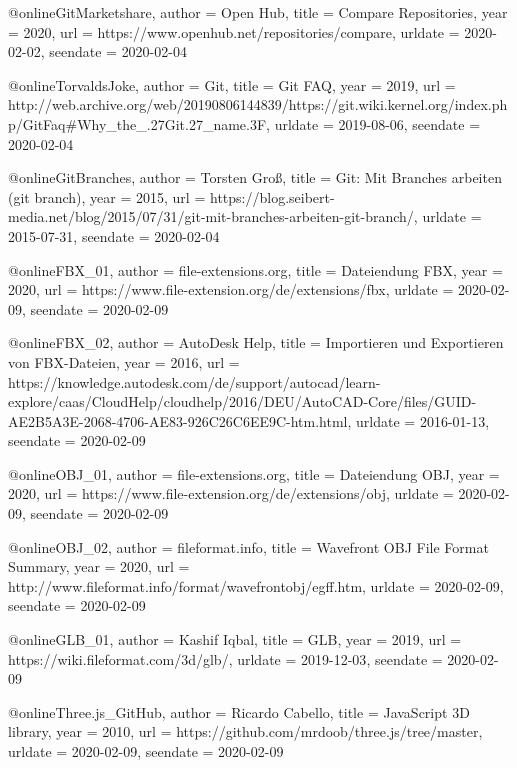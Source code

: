 {{{@online{GitMarketshare,
  author   = {Open Hub},
  title    = {Compare Repositories},
  year     = 2020,
  url      = {https://www.openhub.net/repositories/compare},
  urldate  = {2020-02-02},
  seendate = {2020-02-04}
}

@online{TorvaldsJoke,
  author   = {Git},
  title    = {Git FAQ},
  year     = 2019,
  url      = {http://web.archive.org/web/20190806144839/https://git.wiki.kernel.org/index.php/GitFaq#Why_the_.27Git.27_name.3F},
  urldate  = {2019-08-06},
  seendate = {2020-02-04}
}

@online{GitBranches,
  author   = {Torsten Groß},
  title    = {Git: Mit Branches arbeiten (git branch)},
  year     = 2015,
  url      = {https://blog.seibert-media.net/blog/2015/07/31/git-mit-branches-arbeiten-git-branch/},
  urldate  = {2015-07-31},
  seendate = {2020-02-04}
}

@online{FBX_01,
  author   = {file-extensions.org},
  title    = {Dateiendung FBX},
  year     = 2020,
  url      = {https://www.file-extension.org/de/extensions/fbx},
  urldate  = {2020-02-09},
  seendate = {2020-02-09}
}

@online{FBX_02,
  author   = {AutoDesk Help},
  title    = {Importieren und Exportieren von FBX-Dateien},
  year     = 2016,
  url      = {https://knowledge.autodesk.com/de/support/autocad/learn-explore/caas/CloudHelp/cloudhelp/2016/DEU/AutoCAD-Core/files/GUID-AE2B5A3E-2068-4706-AE83-926C26C6EE9C-htm.html},
  urldate  = {2016-01-13},
  seendate = {2020-02-09}
}


@online{OBJ_01,
  author   = {file-extensions.org},
  title    = {Dateiendung OBJ},
  year     = 2020,
  url      = {https://www.file-extension.org/de/extensions/obj},
  urldate  = {2020-02-09},
  seendate = {2020-02-09}
}

@online{OBJ_02,
  author   = {fileformat.info},
  title    = {Wavefront OBJ File Format Summary},
  year     = 2020,
  url      = {http://www.fileformat.info/format/wavefrontobj/egff.htm},
  urldate  = {2020-02-09},
  seendate = {2020-02-09}
}

@online{GLB_01,
  author   = {Kashif Iqbal},
  title    = {GLB},
  year     = 2019,
  url      = {https://wiki.fileformat.com/3d/glb/},
  urldate  = {2019-12-03},
  seendate = {2020-02-09}
}



@online{Three.js_GitHub,
  author   = {Ricardo Cabello},
  title    = {JavaScript 3D library},
  year     = 2010,
  url      = {https://github.com/mrdoob/three.js/tree/master},
  urldate  = {2020-02-09},
  seendate = {2020-02-09}
}

}}}
